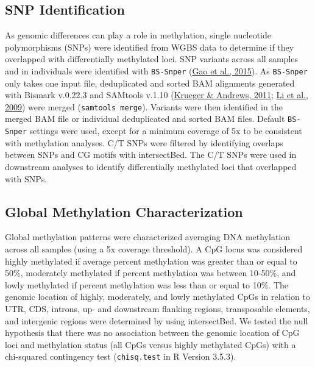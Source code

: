 \documentclass [11pt, proquest] {uwthesis}[2015/03/03]
\begin{document}
\hypertarget{snp-identification}{%
\subsection{SNP Identification}\label{snp-identification}}

As genomic differences can play a role in methylation, single nucleotide polymorphisms (SNPs) were identified from WGBS data to determine if they overlapped with differentially methylated loci. SNP variants across all samples and in individuals were identified with \texttt{BS-Snper} (\protect\hyperlink{ref-Gao2015}{Gao et al., 2015}). As \texttt{BS-Snper} only takes one input file, deduplicated and sorted BAM alignments generated with Bismark v.0.22.3 and SAMtools v.1.10 (\protect\hyperlink{ref-Krueger2011}{Krueger \& Andrews, 2011}; \protect\hyperlink{ref-Li2009}{Li et al., 2009}) were merged (\texttt{samtools\ merge}). Variants were then identified in the merged BAM file or individual deduplicated and sorted BAM files. Default \texttt{BS-Snper} settings were used, except for a minimum coverage of 5x to be consistent with methylation analyses. C/T SNPs were filtered by identifying overlaps between SNPs and CG motifs with intersectBed. The C/T SNPs were used in downstream analyses to identify differentially methylated loci that overlapped with SNPs.

\hypertarget{global-methylation-characterization}{%
\subsection{Global Methylation Characterization}\label{global-methylation-characterization}}

Global methylation patterns were characterized averaging DNA methylation across all samples (using a 5x coverage threshold). A CpG locus was considered highly methylated if average percent methylation was greater than or equal to 50\%, moderately methylated if percent methylation was between 10-50\%, and lowly methylated if percent methylation was less than or equal to 10\%. The genomic location of highly, moderately, and lowly methylated CpGs in relation to UTR, CDS, introns, up- and downstream flanking regions, transposable elements, and intergenic regions were determined by using intersectBed. We tested the null hypothesis that there was no association between the genomic location of CpG loci and methylation status (all CpGs versus highly methylated CpGs) with a chi-squared contingency test (\texttt{chisq.test} in R Version 3.5.3).
\end{document}
